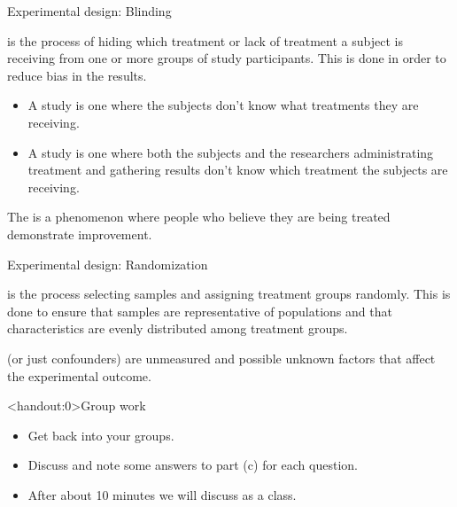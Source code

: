 \documentclass[xcolor=table, handout]{beamer}
\begin{document}
\begin{frame}{Experimental design: Blinding}
\begin{block}{}
\large
{} is the process of hiding which treatment or lack of treatment a subject is receiving from one or more groups of study participants. This is done in order to reduce bias in the results.

\begin{itemize}
\pause\item A  study is one where the subjects don't know what treatments they are receiving.

\pause\item A  study is one where both the subjects and the researchers administrating treatment and gathering results don't know which treatment the subjects are receiving.
\end{itemize}
\end{block}

\pause
\begin{block}{}
\large
The  is a phenomenon where people who believe they are being treated demonstrate improvement.
\end{block}
\end{frame}

\begin{frame}{Experimental design: Randomization}

\begin{block}{}
\large
{} is the process selecting samples and assigning treatment groups randomly. This is done to ensure that samples are representative of populations and that characteristics are evenly distributed among treatment groups.
\end{block}

\pause
\begin{block}{}
\large
{} (or just confounders) are unmeasured and possible unknown factors that affect the experimental outcome. 
\end{block}
\end{frame}

\begin{frame}<handout:0>{Group work}
\begin{block}{}
\large
\begin{itemize}
\item Get back into your groups.
\item Discuss and note some answers to part (c) for each question.
\item After about 10 minutes we will discuss as a class. 
\end{itemize}
\end{block}
\end{frame}
\end{document}

